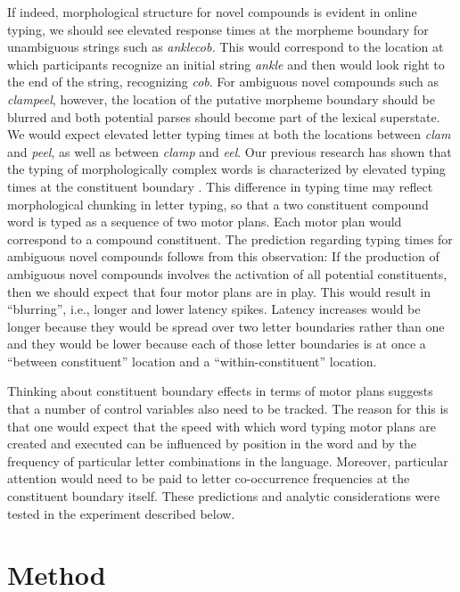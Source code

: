 \documentclass[output=paper]{langsci/langscibook}
\begin{document}
If indeed, morphological structure for novel compounds is evident in online typing, we should see elevated response times at the morpheme boundary for unambiguous strings such as \textit{anklecob.} This would correspond to the location at which participants recognize an initial string \textit{ankle} and then would look right to the end of the string, recognizing \textit{cob}. For ambiguous novel compounds such as \textit{clampeel}, however, the location of the putative morpheme boundary should be blurred and both potential parses should become part of the lexical superstate.  We would expect elevated letter typing times at both the locations between \textit{clam} and \textit{peel}, as well as between \textit{clamp} and \textit{eel}.  %
Our previous research has shown that the typing of morphologically complex words is characterized by elevated typing times at the constituent boundary \citep{LibbenWeber2014,LibbenJaremaEtAl2016}. This difference in typing time may reflect morphological chunking in letter typing, so that a two constituent compound word is typed as a sequence of two motor plans. Each motor plan would correspond to a compound constituent. The prediction regarding typing times for ambiguous novel compounds follows from this observation: If the production of ambiguous novel compounds involves the activation of all potential constituents, then we should expect that four motor plans are in play.  This would result in ``blurring'', i.e., longer and lower latency spikes. Latency increases would be longer because they would be spread over two letter boundaries rather than one and they would be lower because each of those letter boundaries is at once a ``between constituent'' location and a ``within-constituent'' location.

Thinking about constituent boundary effects in terms of motor plans suggests that a number of control variables also need to be tracked.  The reason for this is that one would expect that the speed with which word typing motor plans are created and executed can be influenced by position in the word and by the frequency of particular letter combinations in the language. Moreover, particular attention would need to be paid to letter co-occurrence frequencies at the constituent boundary itself.  These predictions and analytic considerations were tested in the experiment described below.

\section{Method}\label{sec:libben:2}
\end{document}
